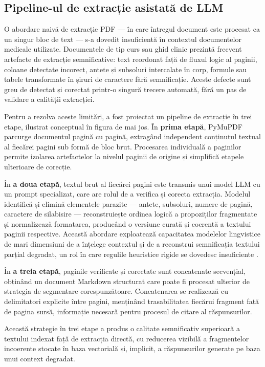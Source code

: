 \documentclass[12pt, a4paper, oneside, romanian]{teza-upb}
\begin{document}
\subsection{Pipeline-ul de extracție asistată de LLM}

O abordare naivă de extracție PDF — în care întregul document este procesat ca un singur bloc de text — s-a dovedit insuficientă în contextul documentelor medicale utilizate. Documentele de tip curs sau ghid clinic prezintă frecvent artefacte de extracție semnificative: text reordonat față de fluxul logic al paginii, coloane detectate incorect, antete și subsoluri intercalate în corp, formule sau tabele transformate în șiruri de caractere fără semnificație. Aceste defecte sunt greu de detectat și corectat printr-o singură trecere automată, fără un pas de validare a calității extracției.

Pentru a rezolva aceste limitări, a fost proiectat un pipeline de extracție în trei etape, ilustrat conceptual în figura de mai jos. În \textbf{prima etapă}, PyMuPDF parcurge documentul pagină cu pagină, extragând independent conținutul textual al fiecărei pagini sub formă de bloc brut. Procesarea individuală a paginilor permite izolarea artefactelor la nivelul paginii de origine și simplifică etapele ulterioare de corecție.

În \textbf{a doua etapă}, textul brut al fiecărei pagini este transmis unui model LLM cu un prompt specializat, care are rolul de a verifica și corecta extracția. Modelul identifică și elimină elementele parazite — antete, subsoluri, numere de pagină, caractere de silabisire — reconstruiește ordinea logică a propoziților fragmentate și normalizează formatarea, producând o versiune curată și coerentă a textului paginii respective. Această abordare exploatează capacitatea modelelor lingvistice de mari dimensiuni de a înțelege contextul și de a reconstrui semnificația textului parțial degradat, un rol în care regulile heuristice rigide se dovedesc insuficiente \cite{llm_review_2024}.

În \textbf{a treia etapă}, paginile verificate și corectate sunt concatenate secvențial, obținând un document Markdown structurat care poate fi procesat ulterior de strategia de segmentare corespunzătoare. Concatenarea se realizează cu delimitatori explicite între pagini, menținând trasabilitatea fiecărui fragment față de pagina sursă, informație necesară pentru procesul de citare al răspunsurilor.

Această strategie în trei etape a produs o calitate semnificativ superioară a textului indexat față de extracția directă, cu reducerea vizibilă a fragmentelor incoerente stocate în baza vectorială și, implicit, a răspunsurilor generate pe baza unui context degradat.
\end{document}
